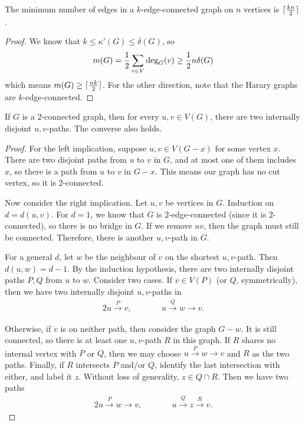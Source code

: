 \begin{corollary}
  The minimum number of edges in a $k$-edge-connected graph on $n$ vertices is
  $\lceil \frac{kn}{2} \rceil$.
\end{corollary}

\begin{proof}
  We know that $k \le \kappa'(G) \le \delta(G)$, so
  \[
	m(G) = \frac{1}{2} \sum_{v \in V} \deg_G(v) \ge \frac{1}{2} n \delta(G)
  \]
  which means $m(G) \ge \lceil \frac{nk}{2} \rceil$.
  For the other direction, note that the Harary graphs are $k$-edge-connected.
\end{proof}

\begin{theorem}[Whitney]
  If $G$ is a $2$-connected graph, then for every $u, v \in V(G)$, there are two
  internally disjoint $u,v$-paths.
  The converse also holds.
\end{theorem}

\begin{proof}
  For the left implication, suppose $u, v \in V(G - x)$ for some vertex $x$.
  There are two disjoint paths from $u$ to $v$ in $G$, and at most one of them
  includes $x$, so there is a path from $u$ to $v$ in $G - x$.
  This means our graph has no cut vertex, so it is $2$-connected.

  Now consider the right implication.
  Let $u, v$ be vertices in $G$.
  Induction on $d = d(u,v)$.
  For $d = 1$, we know that $G$ is $2$-edge-connected (since it is
  $2$-connected), so there is no bridge in $G$.
  If we remove $uv$, then the graph must still be connected.
  Therefore, there is another $u,v$-path in $G$.

  For a general $d$, let $w$ be the neighbour of $v$ on the shortest $u,v$-path.
  Then $d(u,w) = d-1$.
  By the induction hypothesis, there are two internally disjoint paths $P, Q$
  from $u$ to $w$.
  Consider two cases.
  If $v \in V(P)$ (or $Q$, symmetrically), then we have two internally disjoint
  $u,v$-paths in
  \begin{alignat*}{2}
	u \xrightarrow{P} v,
	& \qquad &
			   u \xrightarrow{Q} w \to v.
  \end{alignat*}

  Otherwise, if $v$ is on neither path, then consider the graph $G - w$.
  It is still connected, so there is at least one $u,v$-path $R$ in this graph.
  If $R$ shares no internal vertex with $P$ or $Q$, then we may choose $u
  \xrightarrow{P} w \to v$ and $R$ as the two paths.
  Finally, if $R$ intersects $P$ and/or $Q$, identify the last intersection with
  either, and label it $z$.
  Without loss of generality, $z \in Q \cap R$.
  Then we have two paths
  \begin{alignat*}{2}
	u \xrightarrow{P} w \to v,
	& \qquad &
			   u \xrightarrow{Q} z \xrightarrow{R} v.
  \end{alignat*}
\end{proof}

